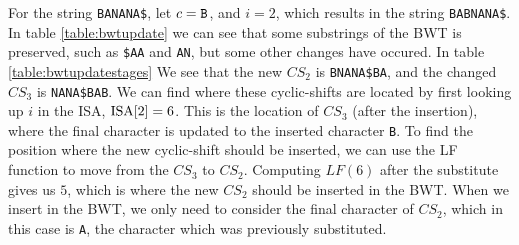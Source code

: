 For the string \verb|BANANA$|, let $c = \verb|B|$, and $i = 2$, which results in the
string \verb|BABNANA$|. In table \ref{table:bwtupdate} we can see that some substrings of
the BWT is preserved, such as \verb|$AA| and \verb|AN|, but some other changes have
occured. In table \ref{table:bwtupdatestages} We see that the new $CS_2$ is
\verb|BNANA$BA|, and the changed $CS_3$ is \verb|NANA$BAB|. We can find where these
cyclic-shifts are located by first looking up $i$ in the ISA, $\mathrm{ISA}[{2}] = 6$. This is the
location of $CS_3$ (after the insertion), where the final character is updated to the
inserted character \verb|B|. To find the position where the new cyclic-shift should be
inserted, we can use the LF function to move from the $CS_3$ to $CS_2$. Computing
$LF(6)$ after the substitute gives us $5$, which is where the new $CS_2$ should be
inserted in the BWT. When we insert in the BWT, we only need to consider the final
character of $CS_2$, which in this case is \verb|A|, the character which was previously
substituted.

